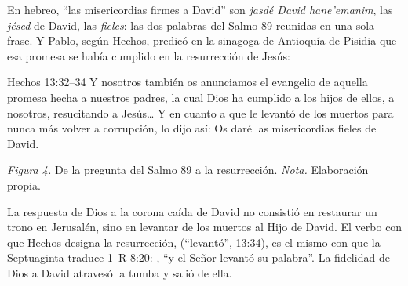 En hebreo, ``las misericordias firmes a David'' son \emph{jasdé David hane'emanim}, las \emph{jésed} de David, las \emph{fieles}: las dos palabras del Salmo 89 reunidas en una sola frase. Y Pablo, según Hechos, predicó en la sinagoga de Antioquía de Pisidia que esa promesa se había cumplido en la resurrección de Jesús:

\begin{verso}{Hechos 13:32–34}
Y nosotros también os anunciamos el evangelio de aquella promesa hecha a nuestros padres, la cual Dios ha cumplido a los hijos de ellos, a nosotros, resucitando a Jesús\ldots{} Y en cuanto a que le levantó de los muertos para nunca más volver a corrupción, lo dijo así: Os daré las misericordias fieles de David.
\end{verso}

\begin{center}
\par
{\footnotesize\color{gris}\textit{Figura 4.} De la pregunta del Salmo 89 a la resurrección. \textit{Nota.} Elaboración propia.}
\end{center}

La respuesta de Dios a la corona caída de David no consistió en restaurar un trono en Jerusalén, sino en levantar de los muertos al Hijo de David. El verbo con que Hechos designa la resurrección,  (``levantó'', 13:34), es el mismo con que la Septuaginta traduce 1~R 8:20: , ``y el Señor levantó su palabra''. La fidelidad de Dios a David atravesó la tumba y salió de ella.

